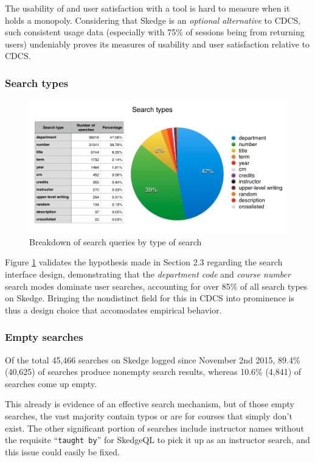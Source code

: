 The usability of and user satisfaction with a tool is hard to measure when it holds a monopoly. Considering that Skedge is an \emph{optional alternative} to CDCS, such consistent usage data (especially with 75\% of sessions being from returning users) undeniably proves its measures of usability and user satisfaction relative to CDCS.

  \subsubsection{Search types}

  \begin{figure}[H]
    \centering
    \includegraphics[width=1.0\textwidth]{images/graph/searchtypes}

    \caption{Breakdown of search queries by type of search}
    \label{fig:searchtypes}
  \end{figure}


Figure \ref{fig:searchtypes} validates the hypothesis made in Section 2.3 regarding the search interface design, demonstrating that the \emph{department code} and \emph{course number} search modes dominate user searches, accounting for over 85\% of all search types on Skedge. Bringing the nondistinct field for this in CDCS into prominence is thus a design choice that accomodates empirical behavior.

\subsubsection{Empty searches}

  Of the total 45,466 searches on Skedge logged since November 2nd 2015, 89.4\% (40,625) of searches produce nonempty search results, whereas 10.6\% (4,841) of searches come up empty.

  This already is evidence of an effective search mechanism, but of those empty searches, the vast majority contain typos or are for courses that simply don't exist. The other significant portion of searches include instructor names without the requisite ``{\tt taught by}'' for SkedgeQL to pick it up as an instructor search, and this issue could easily be fixed.

